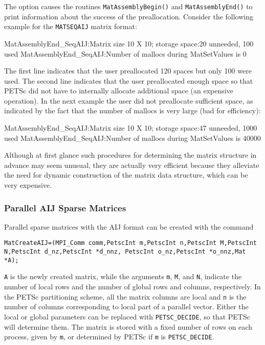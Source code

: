 The   option causes the routines
\lstinline{MatAssemblyBegin()} and \lstinline{MatAssemblyEnd()} to print
information about the success of the preallocation.  Consider the
following example for the \lstinline{MATSEQAIJ} matrix format:
\begin{outputlisting}
MatAssemblyEnd_SeqAIJ:Matrix size 10 X 10; storage space:20 unneeded, 100 used
MatAssemblyEnd_SeqAIJ:Number of mallocs during MatSetValues is 0
\end{outputlisting}
The first line indicates that the user preallocated 120 spaces but only
100 were used. The second line indicates that the user preallocated
enough space so that PETSc did not have to internally allocate additional
space (an expensive operation).  In the next example the user did not
preallocate sufficient space, as indicated by the fact that the number
of mallocs is very large (bad for efficiency):
\begin{outputlisting}
MatAssemblyEnd_SeqAIJ:Matrix size 10 X 10; storage space:47 unneeded, 1000 used
MatAssemblyEnd_SeqAIJ:Number of mallocs during MatSetValues is 40000
\end{outputlisting}

Although at first glance such procedures for determining the matrix
structure in advance may seem unusual, they are actually very
efficient because they alleviate the need for dynamic
construction of the matrix data structure, which can be very
expensive.

\subsubsection{Parallel AIJ Sparse Matrices}

Parallel sparse matrices with the AIJ
format can be created with the command
\begin{lstlisting}
MatCreateAIJ=(MPI_Comm comm,PetscInt m,PetscInt n,PetscInt M,PetscInt N,PetscInt d_nz,PetscInt *d_nnz, PetscInt o_nz,PetscInt *o_nnz,Mat *A);
\end{lstlisting}
\lstinline{A} is the newly created matrix, while the arguments \lstinline{m},
\lstinline{M}, and \lstinline{N}, indicate the number of local rows and
the number of global rows and columns, respectively. In the PETSc partitioning scheme,
all the matrix columns are local and \lstinline{n} is the number of columns
corresponding to local part of a parallel vector.
Either the local or
global parameters can be replaced with \lstinline{PETSC_DECIDE}, so that
PETSc will determine  them.
The matrix is stored with a fixed number of rows on
each process, given by \lstinline{m}, or determined by PETSc if \lstinline{m} is
\lstinline{PETSC_DECIDE}.

